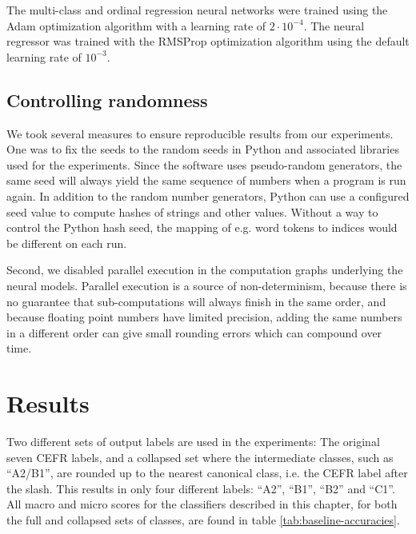 The multi-class and ordinal regression neural networks were trained using the
Adam optimization algorithm \autocite{kingma2014adam} with a learning rate of
$2\cdot 10^{-4}$. The neural regressor was trained with the RMSProp
optimization algorithm using the default learning rate of $10^{-3}$.


\subsection{Controlling randomness}

We took several measures to ensure reproducible results from our experiments.
One was to fix the seeds to the random seeds in Python and associated libraries
used for the experiments. Since the software uses pseudo-random generators,
the same seed will always yield the same sequence of numbers when a program
is run again. In addition to the random number generators, Python can use a
configured seed value to compute hashes of strings and other values. Without a
way to control the Python hash seed, the mapping of e.g. word tokens to indices
would be different on each run.

Second, we disabled parallel execution in the computation graphs underlying
the neural models. Parallel execution is a source of non-determinism, because
there is no guarantee that sub-computations will always finish in the same order,
and because floating point numbers have limited precision, adding the same
numbers in a different order can give small rounding errors which can compound
over time.


\section{Results}

Two different sets of output labels are used in the experiments: The original
seven CEFR labels, and a collapsed set where the intermediate classes, such
as ``A2/B1'', are rounded up to the nearest canonical class, i.e. the CEFR
label after the slash. This results in only four different labels: ``A2'',
``B1'', ``B2'' and ``C1''. All macro and micro \FI scores for the classifiers
described in this chapter, for both the full and collapsed sets of classes,
are found in table \ref{tab:baseline-accuracies}.

